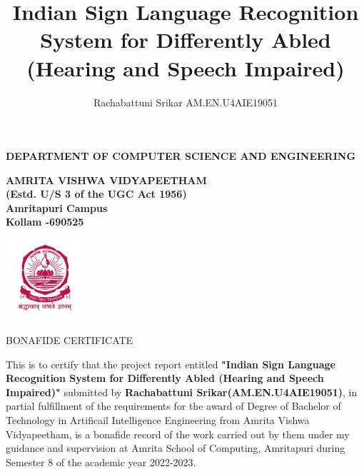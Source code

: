 \documentclass[oneside,12pt]{Classes/CUEDthesisPSnPDF}
\title{Indian Sign Language Recognition System for Differently Abled (Hearing and Speech Impaired)}
\author{Rachabattuni Srikar AM.EN.U4AIE19051}
\begin{document}
\maketitle


\begin{center}


	{\normalsize {\bfseries{DEPARTMENT OF COMPUTER SCIENCE AND ENGINEERING\\[1ex]}}}


	{\normalsize {\bfseries{AMRITA VISHWA VIDYAPEETHAM \\ (Estd. U/S 3 of the UGC Act 1956) \\[1ex]Amritapuri  Campus \\[1ex] Kollam -690525\\[1ex]}}}

	\includegraphics[width=30mm]{UNIVEMBLEM.png}


	\rmfamily\bfseries\upshape\Large

	BONAFIDE CERTIFICATE \\[2ex] %

\end{center}


\rmfamily\mdseries\upshape\normalsize

This is to certify that the project report entitled \textbf{"Indian Sign Language Recognition System for Differently Abled (Hearing and Speech Impaired)"} submitted by \textbf{Rachabattuni Srikar(AM.EN.U4AIE19051)}, in partial fulfillment of the requirements for the award of Degree of Bachelor of Technology in Artificail Intelligence Engineering from Amrita Vishwa Vidyapeetham, is a bonafide record of the work carried out by them under my guidance and supervision at Amrita School of Computing, Amritapuri during Semester 8 of the academic year 2022-2023.
\end{document}
